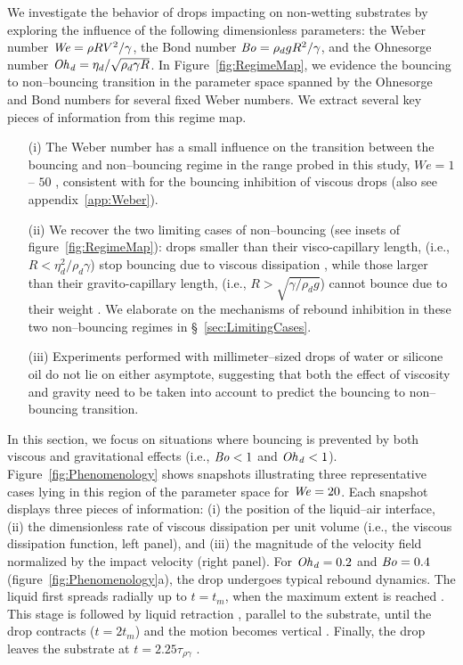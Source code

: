 We investigate the behavior of drops impacting on non-wetting substrates by exploring the influence of the following dimensionless parameters: the Weber number $\mathit{We} = \rho R V^2/\gamma$, the Bond number $\mathit{Bo} = \rho_dgR^2/\gamma $, and the Ohnesorge number $\mathit{Oh}_\mathit{d} = \eta_d/\sqrt{\rho_d\gamma R}$. In Figure~\ref{fig:RegimeMap}, we evidence the bouncing to non--bouncing transition in the parameter space spanned by the Ohnesorge and Bond numbers for several fixed Weber numbers. We extract several key pieces of information from this regime map. 

\begin{itemize}
	\item[(i)] The Weber number has a small influence on the transition between the bouncing and non--bouncing regime in the range probed in this study, $We = 1$ -- $50$ , consistent with \citet{jha2020viscous} for the bouncing inhibition of viscous drops (also see appendix~\ref{app:Weber}).
	\item[(ii)] We recover the two limiting cases of non--bouncing (see insets of figure~\ref{fig:RegimeMap}): drops smaller than their visco-capillary length, (i.e., $R < \eta_d^2/\rho_d\gamma$) stop bouncing due to viscous dissipation \citep{jha2020viscous}, while those larger than their gravito-capillary length, (i.e., $R > \sqrt{\gamma/\rho_d g}$) cannot bounce due to their weight \citep{biance2006}. We elaborate on the mechanisms of rebound inhibition in  these two non--bouncing regimes in \S~\ref{sec:LimitingCases}. 
	\item[(iii)]  Experiments performed with millimeter--sized drops of water or silicone oil do not lie on either asymptote, suggesting that both the effect of viscosity and gravity need to be taken into account to predict the bouncing to non--bouncing transition.
\end{itemize}

In this section, we focus on situations where bouncing is prevented by both viscous and gravitational effects (i.e., $\mathit{Bo} < 1$ and $\mathit{Oh}_\mathit{d} < 1$).
Figure~\ref{fig:Phenomenology} shows snapshots illustrating three representative cases lying in this region of the parameter space for $\mathit{We} = 20$. Each snapshot displays three pieces of information: (i) the position of the liquid--air interface, (ii) the dimensionless rate of viscous dissipation per unit volume (i.e., the viscous dissipation function, left panel), and (iii) the magnitude of the velocity field normalized by the impact velocity (right panel). For $\mathit{Oh}_\mathit{d} = 0.2$ and $\mathit{Bo} = 0.4$ (figure~\ref{fig:Phenomenology}a), the drop undergoes typical rebound dynamics. The liquid first spreads radially up to $t = t_m$, when the maximum extent is reached \citep{clanet2004, eggers2010drop, laan2014maximum, wildeman2016spreading}. This stage is followed by liquid retraction \citep{bartolo2005retraction}, parallel to the substrate, until the drop contracts ($t = 2t_m$) and the motion becomes vertical \citep{chantelot2018rebonds, zhang2022impact}. Finally, the drop leaves the substrate at $t = 2.25\tau_{\rho\gamma}$ \citep{richard2000bouncing, richard2002contact}. 

